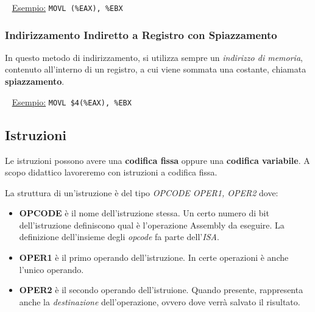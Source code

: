 \documentclass[a4paper,11pt,oneside]{book}
\begin{document}
~\newline
\underline{Esempio:} \tabto{3cm} \texttt{MOVL (\%EAX), \%EBX}

\subsubsection{Indirizzamento Indiretto a Registro con Spiazzamento}
In questo metodo di indirizzamento, si utilizza sempre un \emph{indirizzo di memoria}, contenuto all'interno di un registro, a cui viene sommata una costante, chiamata \textbf{spiazzamento}.

~\newline
\underline{Esempio:} \tabto{3cm} \texttt{MOVL \$4(\%EAX), \%EBX}


\subsection{Istruzioni}
Le istruzioni possono avere una \textbf{codifica fissa} oppure una \textbf{codifica variabile}.
A scopo didattico lavoreremo con istruzioni a codifica fissa.

\noindent La struttura di un'istruzione è del tipo \emph{OPCODE OPER1, OPER2} dove:
\begin{itemize}
    \item \textbf{OPCODE} è il nome dell'istruzione stessa. Un certo numero di bit dell'istruzione definiscono qual è l'operazione Assembly da eseguire.
    La definizione dell'insieme degli \emph{opcode} fa parte dell'\emph{ISA}.    
    \item \textbf{OPER1} è il primo operando dell'istruzione. In certe operazioni è anche l'unico operando.
    \item \textbf{OPER2} è il secondo operando dell'istruione. Quando presente, rappresenta anche la \emph{destinazione} dell'operazione, ovvero dove
          verrà salvato il risultato.
\end{itemize}
\end{document}
